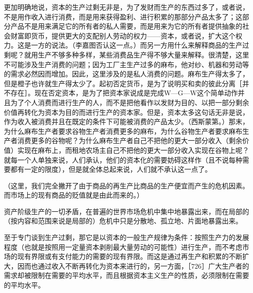 更加明确地说，资本的生产过剩无非是，为了发财而生产的东西过多了，或者说，不是用作收入进行消费，而是用来获得盈利、进行积累的那部分产品太多了；这部分产品不是用来满足它的所有者的私人需要，而是用来为它的所有者提供抽象的社会财富即货币，提供更大的支配别人劳动的权力——资本，或者说，扩大这个权力。这是一方的说法。（李嘉图否认这一点。）而另一方用什么来解释商品的生产过剩呢？就用生产不够多种多样，某些消费品生产得不够大量来解释。很清楚，这里不可能涉及生产消费的问题；因为工厂主生产过多的麻布，他对纱、机器和劳动等的需求必然因而增加。因此，这里涉及的是私人消费的问题。麻布生产得太多了，但是橙子也许就生产得太少了。起初否定货币，是为了说明买和卖的彼此分离［并不存在］。现在否定资本，是为了把资本家说成是完成W—G—W这个简单动作并且为了个人消费而进行生产的人，而不是把他看作以发财为目的、以把一部分剩余价值再转化为资本为目的而进行生产的资本家。但是，资本太多这句话无非是说，作为收入被消费并且在既定的条件下可能被消费的产品太少。（西斯蒙第。）那末，为什么麻布生产者要求谷物生产者消费更多的麻布，为什么谷物生产者要求麻布生产者消费更多的谷物呢？为什么麻布生产者自己不把他的更大一部分收入（剩余价值）实现在麻布上，而租地农场主自己不把他的更大一部分收入实现在谷物上呢？就每一个人单独来说，人们承认，他们的资本化的需要妨碍这样作（且不说每种需要都有一定的限度），但是就全体总起来说，人们就不承认这一点了。

（这里，我们完全撇开了由于商品的再生产比商品的生产便宜而产生的危机因素。而市场上的现有商品的贬值就是由此而来的。）

资产阶级生产的一切矛盾，在普遍的世界市场危机中集中地暴露出来，而在局部的（按内容和范围来说是局部的）危机中只是分散地、孤立地、片面地暴露出来。

至于专门谈到生产过剩，那它是以资本的一般生产规律为条件：按照生产力的发展程度（也就是按照用一定量资本剥削最大量劳动的可能性）进行生产，而不考虑市场的现有界限或有支付能力的需要的现有界限。而这是通过再生产和积累的不断扩大，因而也通过收入不断再转化为资本来进行的，另一方面，［726］广大生产者的需求却被限制在需要的平均水平，而且根据资本主义生产的性质，必须限制在需要的平均水平。

